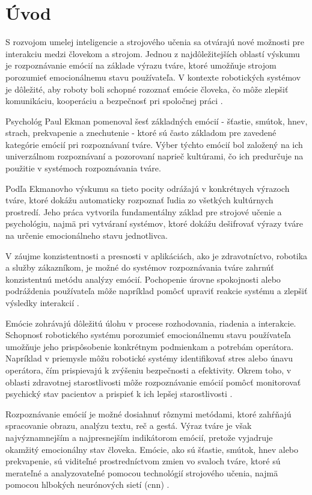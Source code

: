 \section{Úvod}
S rozvojom umelej inteligencie a strojového učenia sa otvárajú nové možnosti pre interakciu medzi človekom a strojom. Jednou z najdôležitejších oblastí výskumu je rozpoznávanie emócií na základe výrazu tváre, 
ktoré umožňuje strojom porozumieť emocionálnemu stavu používateľa. V kontexte robotických systémov je dôležité, aby roboty boli schopné rozoznať emócie človeka, čo môže zlepšiť komunikáciu, 
kooperáciu a bezpečnosť pri spoločnej práci \cite{article04}.

Psychológ Paul Ekman pomenoval šesť základných emócií - šťastie, smútok, hnev, strach, prekvapenie a znechutenie - ktoré sú často základom pre zavedené kategórie emócií pri rozpoznávaní tváre. 
Výber týchto emócií bol založený na ich univerzálnom rozpoznávaní a pozorovaní naprieč kultúrami, čo ich predurčuje na použitie v systémoch rozpoznávania tváre.

Podľa Ekmanovho výskumu sa tieto pocity odrážajú v konkrétnych výrazoch tváre, ktoré dokážu automaticky rozpoznať ľudia zo všetkých kultúrnych prostredí. Jeho práca vytvorila fundamentálny základ 
pre strojové učenie a psychológiu, najmä pri vytváraní systémov, ktoré dokážu dešifrovať výrazy tváre na určenie emocionálneho stavu jednotlivca.

V záujme konzistentnosti a presnosti v aplikáciách, ako je zdravotníctvo, robotika a služby zákazníkom, je možné do systémov rozpoznávania tváre zahrnúť konzistentnú metódu analýzy emócií. 
Pochopenie úrovne spokojnosti alebo podráždenia používateľa môže napríklad pomôcť upraviť reakcie systému a zlepšiť výsledky interakcií \cite{article06}.

Emócie zohrávajú dôležitú úlohu v procese rozhodovania, riadenia a interakcie. Schopnosť robotického systému porozumieť emocionálnemu stavu používateľa umožňuje jeho prispôsobenie konkrétnym podmienkam a 
potrebám operátora. Napríklad v priemysle môžu robotické systémy identifikovať stres alebo únavu operátora, čím prispievajú k zvýšeniu bezpečnosti a efektivity​. Okrem toho, v oblasti zdravotnej starostlivosti 
môže rozpoznávanie emócií pomôcť monitorovať psychický stav pacientov a prispieť k ich lepšej starostlivosti​ \cite{article03}. 

Rozpoznávanie emócií je možné dosiahnuť rôznymi metódami, ktoré zahŕňajú spracovanie obrazu, analýzu textu, reč a gestá​. Výraz tváre je však najvýznamnejším a najpresnejším indikátorom emócií, 
pretože vyjadruje okamžitý emocionálny stav človeka. Emócie, ako sú šťastie, smútok, hnev alebo prekvapenie, sú viditeľné prostredníctvom zmien vo svaloch tváre, ktoré sú merateľné a analyzovateľné 
pomocou technológií strojového učenia, najmä pomocou hlbokých neurónových sietí (\gls{cnn}) \cite{article04}.

